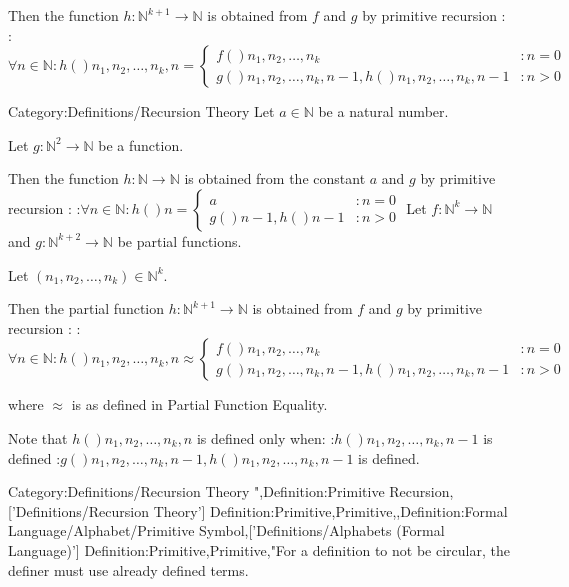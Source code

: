 Then the function $h: \mathbb N^{k + 1} \to \mathbb N$ is obtained from $f$ and $g$ by primitive recursion :
:$\forall n \in \mathbb N: h \left(   \right){n_1, n_2, \ldots, n_k, n} = \begin {cases}
f \left(   \right){n_1, n_2, \ldots, n_k} & : n = 0 \\
g \left(   \right){n_1, n_2, \ldots, n_k, n - 1, h \left(   \right){n_1, n_2, \ldots, n_k, n - 1} } & : n > 0 
\end {cases}$


Category:Definitions/Recursion Theory
Let $a \in \mathbb N$ be a natural number.

Let $g: \mathbb N^2 \to \mathbb N$ be a function.

Then the function $h: \mathbb N \to \mathbb N$ is obtained from the constant $a$ and $g$ by primitive recursion :
:$\forall n \in \mathbb N: h \left(   \right)n = \begin {cases}
a & : n = 0 \\
g \left(   \right){n - 1, h \left(   \right){n - 1} } & : n > 0 
\end{cases}$
Let $f: \mathbb N^k \to \mathbb N$ and $g: \mathbb N^{k+2} \to \mathbb N$ be partial functions.

Let $\left( n_1, n_2, \ldots, n_k \right) \in \mathbb N^k$.

Then the partial function $h: \mathbb N^{k + 1} \to \mathbb N$ is obtained from $f$ and $g$ by primitive recursion :
:$\forall n \in \mathbb N: h \left(   \right){n_1, n_2, \ldots, n_k, n} \approx \begin {cases}
f \left(   \right){n_1, n_2, \ldots, n_k} & : n = 0 \\
g \left(   \right){n_1, n_2, \ldots, n_k, n - 1, h \left(   \right){n_1, n_2, \ldots, n_k, n - 1} } & : n > 0 
\end{cases}$

where $\approx$ is as defined in Partial Function Equality.


Note that $h \left(   \right){n_1, n_2, \ldots, n_k, n}$ is defined only when:
:$h \left(   \right){n_1, n_2, \ldots, n_k, n - 1}$ is defined
:$g \left(   \right){n_1, n_2, \ldots, n_k, n - 1, h \left(   \right){n_1, n_2, \ldots, n_k, n - 1} }$ is defined.


Category:Definitions/Recursion Theory
",Definition:Primitive Recursion,['Definitions/Recursion Theory']
Definition:Primitive,Primitive,,Definition:Formal Language/Alphabet/Primitive Symbol,['Definitions/Alphabets (Formal Language)']
Definition:Primitive,Primitive,"For a definition to not be circular, the definer must use already defined terms. 


